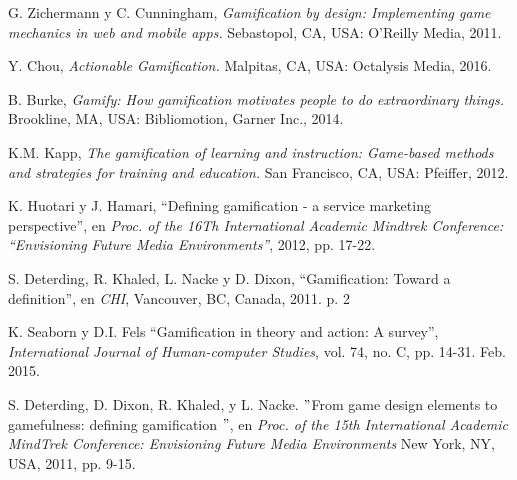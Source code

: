 

\begin{thebibliography}{9}

        G. Zichermann y C. Cunningham,
        {\it Gamification by design: Implementing game mechanics in web and mobile apps.}
        Sebastopol, CA, USA: O'Reilly Media, 2011.

        Y. Chou,
        {\it Actionable Gamification.}
        Malpitas, CA, USA: Octalysis Media, 2016.

        B. Burke,
        {\it Gamify: How gamification motivates people to do extraordinary things.}
        Brookline, MA, USA: Bibliomotion, Garner Inc., 2014.

        K.M. Kapp,
        {\it The gamification of learning and instruction: Game-based methods and strategies for training and education.}
        San Francisco, CA, USA: Pfeiffer, 2012.

        K. Huotari y J. Hamari,
        ``Defining gamification - a service marketing perspective'', en
        {\it Proc. of the 16Th International Academic Mindtrek Conference: ``Envisioning Future Media Environments''},
        2012, pp. 17-22.

        S. Deterding, R. Khaled, L. Nacke y D. Dixon,
        ``Gamification: Toward a definition'',  en
        {\it CHI}, Vancouver, BC, Canada, 2011. p. 2

        K. Seaborn y D.I. Fels
        ``Gamification in theory and action: A survey'',
        {\it International Journal of Human-computer Studies}, vol. 74, no. C, pp. 14-31. Feb. 2015.

        S. Deterding, D. Dixon, R. Khaled, y L. Nacke.
        $"$From game design elements to gamefulness: defining gamification $"$, en {\it Proc. of the 15th
        International Academic MindTrek Conference: Envisioning Future Media Environments} New York, NY, USA, 2011, pp. 9-15.



\end{thebibliography}
